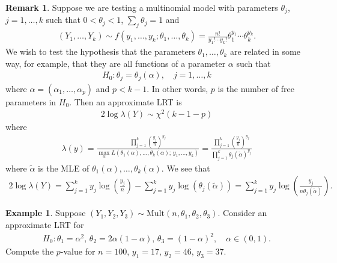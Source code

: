 \documentclass[11pt]{amsart}
\theoremstyle{definition}
\newtheorem{remark}[theorem]{Remark}
\newtheorem{example}[theorem]{Example}
\numberwithin{equation}{section}
\begin{document}
\begin{remark}
    Suppose we are testing a multinomial model with parameters $\theta_j$, $j=1,\ldots,k$ such that $0<\theta_j<1$, $\sum_j\theta_j=1$ and 
    \begin{align*}
        (Y_1,\ldots,Y_k)\sim f(y_1,\ldots,y_k;\theta_1,\ldots,\theta_k)=\frac{n!}{y_1!\cdots y_k!}\theta_1^{y_1}\cdots\theta_k^{y_k}.
    \end{align*}
    We wish to test the hypothesis that the parameters $\theta_1,\ldots,\theta_k$ are related in some way, for example, that they are all functions of a parameter $\alpha$ such that
    \begin{align*}
        H_0:\theta_j=\theta_j(\alpha),\quad j=1,\ldots,k
    \end{align*}
    where $\alpha=(\alpha_1,\ldots,\alpha_p)$ and $p<k-1$. In other words, $p$ is the number of free parameters in $H_0$. Then an approximate LRT is 
    \begin{align*}
        2\log\lambda(Y)\sim \chi^2(k-1-p)
    \end{align*}
    where 
    \begin{align*}
        \lambda(y)=\frac{\prod_{j=1}^k\left(\frac{y_j}{n}\right)^{y_j}}{\max_\alpha L(\theta_1(\alpha),\ldots,\theta_k(\alpha);\,y_1,\ldots,y_k)}=\frac{\prod_{j=1}^k\left(\frac{y_j}{n}\right)^{y_j}}{\prod_{j=1}^k\theta_j(\tilde\alpha)^{y_j}}
    \end{align*}
    where $\tilde \alpha$ is the MLE of $\theta_1(\alpha),\ldots,\theta_k(\alpha)$. We see that
    \begin{align*}
        2\log\lambda(Y)=\sum_{j=1}^ky_j\log(\frac{y_j}{n})-\sum_{j=1}^ky_j\log(\theta_j(\tilde\alpha))=\sum_{j=1}^ky_j\log(\frac{y_j}{n\theta_j(\tilde\alpha)}).
    \end{align*}
\end{remark}
\begin{example}
    Suppose $(Y_1,Y_2,Y_3)\sim\mathrm{Mult}(n,\theta_1,\theta_2,\theta_3)$. Consider an approximate LRT for
    \begin{align*}
        H_0:\theta_1=\alpha^2,\,\theta_2=2\alpha(1-\alpha),\,\theta_3=(1-\alpha)^2,\quad\alpha\in(0,1).
    \end{align*}
    Compute the $p$-value for $n=100$, $y_1=17$, $y_2=46$, $y_3=37$.
\end{example}
\addtocounter{theorem}{-1}
\end{document}
